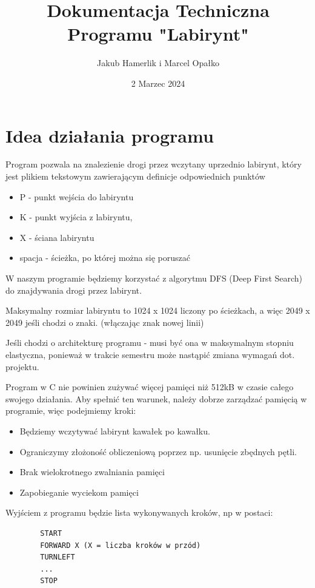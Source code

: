 \documentclass{article}
\title{Dokumentacja Techniczna Programu "Labirynt"}
\author{Jakub Hamerlik i Marcel Opałko}
\date{2 Marzec 2024}
\begin{document}
\maketitle

\section{Idea działania programu}

Program pozwala na znalezienie drogi przez wczytany uprzednio labirynt, który jest plikiem tekstowym zawierającym definicje odpowiednich punktów

\begin{itemize}
    \item P - punkt wejścia do labiryntu
    \item K - punkt wyjścia z labiryntu,
    \item X - ściana labiryntu
    \item spacja - ścieżka, po której można się poruszać
\end{itemize}

W naszym programie będziemy korzystać z algorytmu DFS (Deep First Search) do znajdywania drogi przez labirynt.\newline

Maksymalny rozmiar labiryntu to 1024 x 1024 liczony po ścieżkach, a więc 2049 x 2049 jeśli chodzi o znaki. (włączając znak nowej linii)\newline

Jeśli chodzi o architekturę programu - musi być ona w maksymalnym stopniu elastyczna, ponieważ w trakcie semestru może nastąpić zmiana wymagań dot. projektu.\newline

Program w C nie powinien zużywać więcej pamięci niż 512kB w czasie całego swojego działania. Aby spełnić ten warunek, należy dobrze zarządzać pamięcią w programie, więc podejmiemy kroki:
\begin{itemize}
    \item Będziemy wczytywać labirynt kawałek po kawałku.
    \item Ograniczymy złożoność obliczeniową poprzez np. usunięcie zbędnych pętli.
    \item Brak wielokrotnego zwalniania pamięci
    \item Zapobieganie wyciekom pamięci
\end{itemize}

\newpage


Wyjściem z programu będzie lista wykonywanych kroków, np w postaci:\newline
\begin{verbatim}
        START
        FORWARD X (X = liczba kroków w przód)
        TURNLEFT
        ...
        STOP
\end{verbatim}
       
\end{document}
